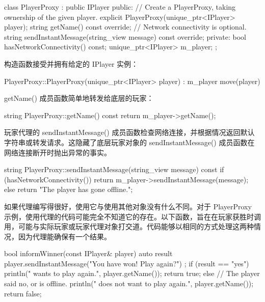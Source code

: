 \begin{cpp}
class PlayerProxy : public IPlayer
{
    public:
        // Create a PlayerProxy, taking ownership of the given player.
        explicit PlayerProxy(unique_ptr<IPlayer> player);
        string getName() const override;
        // Network connectivity is optional.
        string sendInstantMessage(string_view message) const override;
    private:
        bool hasNetworkConnectivity() const;
        unique_ptr<IPlayer> m_player;
};
\end{cpp}

构造函数接受并拥有给定的 IPlayer 实例：

\begin{cpp}
PlayerProxy::PlayerProxy(unique_ptr<IPlayer> player)
    : m_player { move(player) } { }
\end{cpp}

getName() 成员函数简单地转发给底层的玩家：

\begin{cpp}
string PlayerProxy::getName() const { return m_player->getName(); }
\end{cpp}

玩家代理的 sendInstantMessage() 成员函数检查网络连接，并根据情况返回默认字符串或转发请求。这隐藏了底层玩家对象的 sendInstantMessage() 成员函数在网络连接断开时抛出异常的事实。

\begin{cpp}
string PlayerProxy::sendInstantMessage(string_view message) const
{
    if (hasNetworkConnectivity()) { return m_player->sendInstantMessage(message); }
    else { return "The player has gone offline."; }
}
\end{cpp}


如果代理编写得很好，使用它与使用其他对象没有什么不同。对于 PlayerProxy 示例，使用代理的代码可能完全不知道它的存在。以下函数，旨在在玩家获胜时调用，可能与实际玩家或玩家代理对象打交道。代码能够以相同的方式处理这两种情况，因为代理能确保有一个结果。

\begin{cpp}
bool informWinner(const IPlayer& player)
{
    auto result { player.sendInstantMessage("You have won! Play again?") };
    if (result == "yes") {
        println("{} wants to play again.", player.getName());
        return true;
    } else {
        // The player said no, or is offline.
        println("{} does not want to play again.", player.getName());
        return false;
    }
}
\end{cpp}






